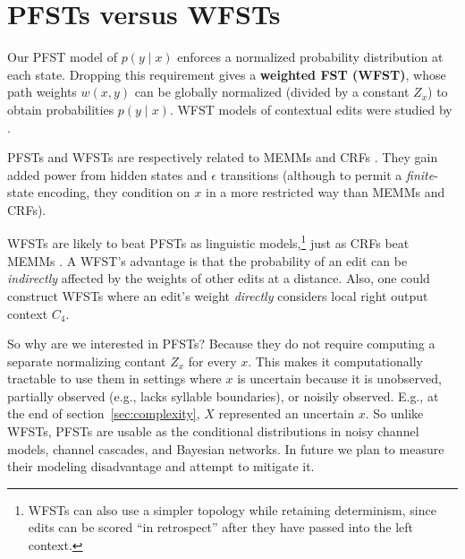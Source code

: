 \documentclass[11pt,letterpaper]{article}
\begin{document}
\section{PFSTs versus WFSTs}\label{sec:discussion}
 
Our PFST model of $p(y\mid x)$ enforces a normalized probability distribution at each state.
Dropping this requirement gives a {\bf weighted FST (WFST)}, whose path weights $w(x,y)$ can be globally normalized (divided by a constant $Z_x$) to obtain probabilities $p(y\mid x)$.  WFST models of contextual edits were studied by .  

PFSTs and WFSTs are respectively related to MEMMs \cite{mccallum00} and CRFs \cite{lafferty2001conditional}.  
They gain added power from hidden states and $\epsilon$ transitions
(although to permit a {\em finite}-state encoding, they condition on $x$ in a more restricted way than MEMMs and CRFs).

WFSTs are likely to beat PFSTs as linguistic models,\footnote{WFSTs can also use a simpler topology \cite{dreyer2008latent} while retaining determinism, since edits can be scored ``in retrospect'' after they have passed into the left context.}  just as CRFs beat MEMMs \cite{klein-manning-2002-condit}.  A WFST's advantage is that the probability of an edit can be {\em indirectly} affected by the weights of other edits at a distance.  Also, one could construct WFSTs where an edit's weight {\em directly} considers local right output context $C_4$.

So why are we interested in PFSTs?  Because they do not require computing a separate normalizing contant $Z_x$ for every $x$.  This makes it computationally tractable to use them in settings where $x$ is uncertain because it is unobserved, partially observed (e.g., lacks syllable boundaries), or noisily observed.  E.g., at the end of section~\ref{sec:complexity}, $X$ represented an uncertain $x$.  So unlike WFSTs, PFSTs are usable as the conditional distributions in noisy channel models, channel cascades, and Bayesian networks.  In future we plan to measure their modeling disadvantage and 
attempt to mitigate it.

\end{document}
